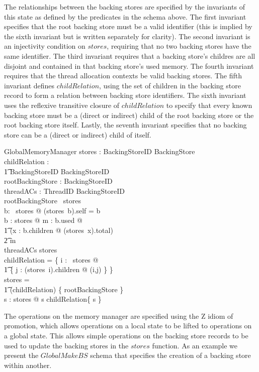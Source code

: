 \documentclass[a4paper,10pt]{report}
\begin{document}
The relationships between the backing stores are specified by the invariants of
this state as defined by the predicates in the schema above. The first invariant
specifies that the root backing store must be a valid identifier (this is
implied by the sixth invariant but is written separately for clarity). The
second invariant is an injectivity condition on $stores$, requiring that no two
backing stores have the same identifier. The third invariant requires that a
backing store's childres are all disjoint and contained in that backing store's 
used memory. The fourth invariant requires that
the thread allocation contexts be valid backing stores. The fifth invariant 
defines $childRelation$, using the set of children in the backing store record
to form a relation between backing store identifiers. The sixth invariant uses
the reflexive transitive closure of $childRelation$ to specify that every known
backing store must be a (direct or indirect) child of the root backing store or
the root backing store itself. Lastly, the seventh invariant specifies that no
backing store can be a (direct or indirect) child of itself.
%
\begin{schema}{GlobalMemoryManager}
  stores : BackingStoreID \pfun BackingStore \\
  childRelation : \\
    \t1 BackingStoreID \rel BackingStoreID \\
  rootBackingStore : BackingStoreID \\
  threadACs : ThreadID \pfun BackingStoreID \\
\where
  rootBackingStore \in \dom~stores \\
  \forall b: \dom~stores @ (stores~b).self = b \\
  \forall b : \ran stores @ \exists m : \power b.used @ \\
    \t1 (\lambda x : b.children @ (stores~x).total) \\
    \t2 \partition m \\
  \ran threadACs \subseteq \dom stores \\
  childRelation = \bigcup \{ i : \dom~stores @ \\ 
    \t1 \{ j : (stores~i).children @ (i,j) \} \} \\
  \dom stores = \\
    \t1 (childRelation\star) \limg \{ rootBackingStore \} \rimg \\
  \forall s : \dom stores @ s \notin childRelation\plus \limg \{ s \} \rimg \\
\end{schema}
%
The operations on the memory manager are specified using the Z idiom of
promotion, which allows operations on a local state to be lifted to operations on
a global state.  This allows simple operations on the backing store records to be
used to update the backing stores in the $stores$ function.  As an
example we present the $GlobalMakeBS$ schema that specifies the creation of a
backing store within another.
\end{document}
